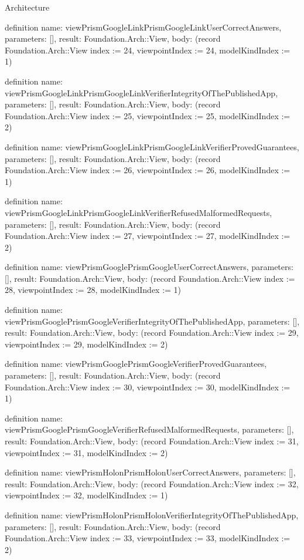 \begin{lexlean}{Architecture}
\begin{semanticmodule}
definition{
  name: viewPrismGoogleLinkPrismGoogleLinkUserCorrectAnswers,
  parameters: [],
  result: Foundation.Arch::View,
  body: (record Foundation.Arch::View {index := 24, viewpointIndex := 24, modelKindIndex := 1})
}

definition{
  name: viewPrismGoogleLinkPrismGoogleLinkVerifierIntegrityOfThePublishedApp,
  parameters: [],
  result: Foundation.Arch::View,
  body: (record Foundation.Arch::View {index := 25, viewpointIndex := 25, modelKindIndex := 2})
}

definition{
  name: viewPrismGoogleLinkPrismGoogleLinkVerifierProvedGuarantees,
  parameters: [],
  result: Foundation.Arch::View,
  body: (record Foundation.Arch::View {index := 26, viewpointIndex := 26, modelKindIndex := 1})
}

definition{
  name: viewPrismGoogleLinkPrismGoogleLinkVerifierRefusedMalformedRequests,
  parameters: [],
  result: Foundation.Arch::View,
  body: (record Foundation.Arch::View {index := 27, viewpointIndex := 27, modelKindIndex := 2})
}

definition{
  name: viewPrismGooglePrismGoogleUserCorrectAnswers,
  parameters: [],
  result: Foundation.Arch::View,
  body: (record Foundation.Arch::View {index := 28, viewpointIndex := 28, modelKindIndex := 1})
}

definition{
  name: viewPrismGooglePrismGoogleVerifierIntegrityOfThePublishedApp,
  parameters: [],
  result: Foundation.Arch::View,
  body: (record Foundation.Arch::View {index := 29, viewpointIndex := 29, modelKindIndex := 2})
}

definition{
  name: viewPrismGooglePrismGoogleVerifierProvedGuarantees,
  parameters: [],
  result: Foundation.Arch::View,
  body: (record Foundation.Arch::View {index := 30, viewpointIndex := 30, modelKindIndex := 1})
}

definition{
  name: viewPrismGooglePrismGoogleVerifierRefusedMalformedRequests,
  parameters: [],
  result: Foundation.Arch::View,
  body: (record Foundation.Arch::View {index := 31, viewpointIndex := 31, modelKindIndex := 2})
}

definition{
  name: viewPrismHolonPrismHolonUserCorrectAnswers,
  parameters: [],
  result: Foundation.Arch::View,
  body: (record Foundation.Arch::View {index := 32, viewpointIndex := 32, modelKindIndex := 1})
}

definition{
  name: viewPrismHolonPrismHolonVerifierIntegrityOfThePublishedApp,
  parameters: [],
  result: Foundation.Arch::View,
  body: (record Foundation.Arch::View {index := 33, viewpointIndex := 33, modelKindIndex := 2})
}


\end{semanticmodule}
\end{lexlean}
